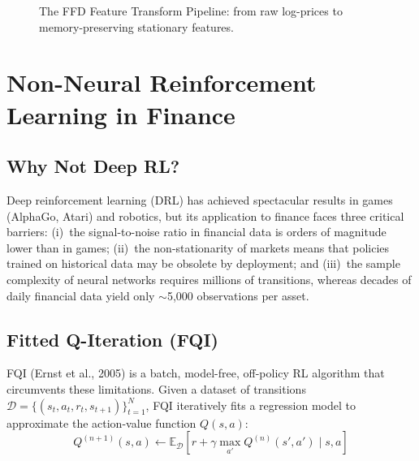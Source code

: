 \documentclass[conference]{IEEEtran}
\begin{document}
\begin{figure}[ht]
\centering
{}
\caption{The FFD Feature Transform Pipeline: from raw log-prices to memory-preserving stationary features.}
\label{fig:ffd}
\end{figure}

\section{Non-Neural Reinforcement Learning in Finance}

\subsection{Why Not Deep RL?}
Deep reinforcement learning (DRL) has achieved spectacular results in games (AlphaGo, Atari) and robotics, but its application to finance faces three critical barriers: (i)~the signal-to-noise ratio in financial data is orders of magnitude lower than in games; (ii)~the non-stationarity of markets means that policies trained on historical data may be obsolete by deployment; and (iii)~the sample complexity of neural networks requires millions of transitions, whereas decades of daily financial data yield only $\sim$5,000 observations per asset.

\subsection{Fitted Q-Iteration (FQI)}
FQI (Ernst et al., 2005) is a batch, model-free, off-policy RL algorithm that circumvents these limitations. Given a dataset of transitions $\mathcal{D} = \{(s_t, a_t, r_t, s_{t+1})\}_{t=1}^{N}$, FQI iteratively fits a regression model to approximate the action-value function $Q(s, a)$:
\begin{equation}
Q^{(n+1)}(s, a) \leftarrow \mathbb{E}_{\mathcal{D}} \left[ r + \gamma \max_{a'} Q^{(n)}(s', a') \mid s, a \right]
\end{equation}
\end{document}
